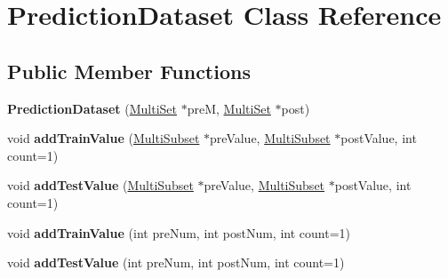\hypertarget{classPredictionDataset}{\section{Prediction\-Dataset Class Reference}
\label{classPredictionDataset}
}
\subsection*{Public Member Functions}
\begin{DoxyCompactItemize}
\item 
\hypertarget{classPredictionDataset_a420bfeab7b55ac8a696c750921eddd10}{{\bfseries Prediction\-Dataset} (\hyperlink{classMultiSet}{Multi\-Set} $\ast$pre\-M, \hyperlink{classMultiSet}{Multi\-Set} $\ast$post)}\label{classPredictionDataset_a420bfeab7b55ac8a696c750921eddd10}

\item 
\hypertarget{classPredictionDataset_ae2d6c192122c2f9f7a1b3232b486d86c}{void {\bfseries add\-Train\-Value} (\hyperlink{classMultiSubset}{Multi\-Subset} $\ast$pre\-Value, \hyperlink{classMultiSubset}{Multi\-Subset} $\ast$post\-Value, int count=1)}\label{classPredictionDataset_ae2d6c192122c2f9f7a1b3232b486d86c}

\item 
\hypertarget{classPredictionDataset_a097fc45e897544af6b5215a26fa41527}{void {\bfseries add\-Test\-Value} (\hyperlink{classMultiSubset}{Multi\-Subset} $\ast$pre\-Value, \hyperlink{classMultiSubset}{Multi\-Subset} $\ast$post\-Value, int count=1)}\label{classPredictionDataset_a097fc45e897544af6b5215a26fa41527}

\item 
\hypertarget{classPredictionDataset_a497f0627a6b80c71a3db7bd140cc0873}{void {\bfseries add\-Train\-Value} (int pre\-Num, int post\-Num, int count=1)}\label{classPredictionDataset_a497f0627a6b80c71a3db7bd140cc0873}

\item 
\hypertarget{classPredictionDataset_ad9e0f63562333d6e7a15134e3aa3894d}{void {\bfseries add\-Test\-Value} (int pre\-Num, int post\-Num, int count=1)}\label{classPredictionDataset_ad9e0f63562333d6e7a15134e3aa3894d}

\end{DoxyCompactItemize}

